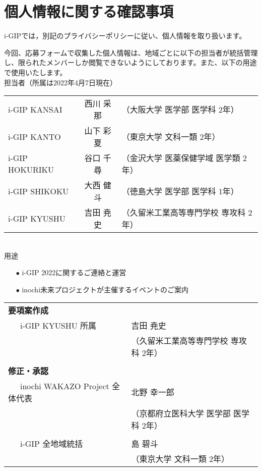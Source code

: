 \documentclass[10.5pt]{jsarticle}
\begin{document}
\vspace{5mm}

\part*{個人情報に関する確認事項}
i-GIPでは，別記のプライバシーポリシーに従い、個人情報を取り扱います。\par
今回、応募フォームで収集した個人情報は、地域ごとに以下の担当者が統括管理し、限られたメンバーしか閲覧できないようにしております。また、以下の用途で使用いたします。\\

\vspace{-6pt}
\noindent 担当者（所属は2022年4月7日現在）\par \vspace{6pt}
\begin{tabular}{lcl}
i-GIP KANSAI & 西川 采那 & （大阪大学 医学部 医学科 2年）\\
i-GIP KANTO & 山下 彩夏 & （東京大学 文科一類 2年）\\
i-GIP HOKURIKU &谷口 千尋 & （金沢大学 医薬保健学域 医学類 2年）\\
i-GIP SHIKOKU & 大西 健斗 & （徳島大学 医学部 医学科 1年）\\
i-GIP KYUSHU & 吉田 尭史 & （久留米工業高等専門学校 専攻科 2年）\\
\end{tabular}
\vspace{12pt}
\\
用途
\begin{itemize}
\vspace{-9pt}
\item[$\bullet$] i-GIP 2022に関するご連絡と運営
\item[$\bullet$] inochi未来プロジェクトが主催するイベントのご案内
\end{itemize}

\vspace{15mm}

\vspace{1cm}
\begin{tabular}{ll}
{\bf \large 要項案作成} 		& 　\\
\ \ \ \normalsize  i-GIP KYUSHU 所属	&吉田 尭史　\\
					& （久留米工業高等専門学校 専攻科 2年）\\
			\vspace{-9pt} \\
{\bf \large 修正・承認} & \\
\ \ \ inochi WAKAZO Project 全体代表 	& 北野 幸一郎\\
									&（京都府立医科大学 医学部 医学科 2年）\\
				\vspace{-6pt} \\
\ \ \ i-GIP 全地域統括				&島 碧斗　　\\
									&（東京大学 文科一類 2年）
\end{tabular}
\end{document}
